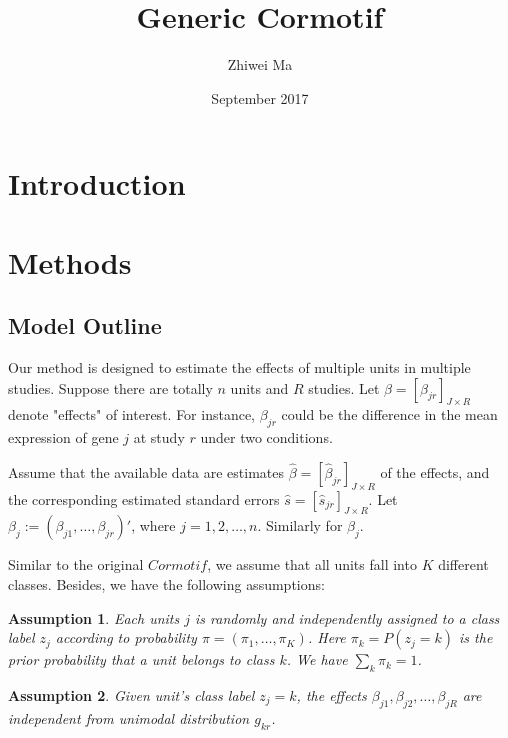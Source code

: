 \documentclass[11pt]{article}
\title{Generic Cormotif}
\author{Zhiwei Ma}
\date{September 2017}
\newtheorem{assumption}{Assumption}
\begin{document}
\maketitle

\section{Introduction}
\section{Methods}

\subsection{Model Outline}

Our method is designed to estimate the effects of multiple units in multiple studies. Suppose there are totally $n$ units and $R$ studies. Let $\beta = [\beta_{jr}]_{J\times R}$ denote "effects" of interest. For instance, $\beta_{jr}$ could be the difference in the mean expression of gene $j$ at study $r$ under two conditions. 

Assume that the available data are estimates $\hat \beta = [\hat \beta_{jr}]_{J\times R}$ of the effects, and the corresponding estimated standard errors $\hat s = [\hat s_{jr}]_{J\times R}$. Let $\beta_j:=(\beta_{j1},\ldots,\beta_{jr})'$, where $j=1,2,\ldots,n$. Similarly for $\hat \beta_j$. 

Similar to the original $Cormotif$, we assume that all units fall into $K$ different classes. Besides, we have the following assumptions:

\begin{assumption}Each units $j$ is randomly and independently assigned to a class label $z_j$ according to probability $\pi=(\pi_1,\ldots,\pi_K)$. Here $\pi_k=P(z_j=k)$ is the prior probability that a unit belongs to class $k$. We have $\sum_k\pi_k = 1$.
\end{assumption}
 
\begin{assumption}Given unit's class label $z_j=k$, the effects $\beta_{j1},\beta_{j2},\ldots,\beta_{jR}$ are independent from unimodal distribution $g_{kr}$. 
\end{assumption}
\end{document}
